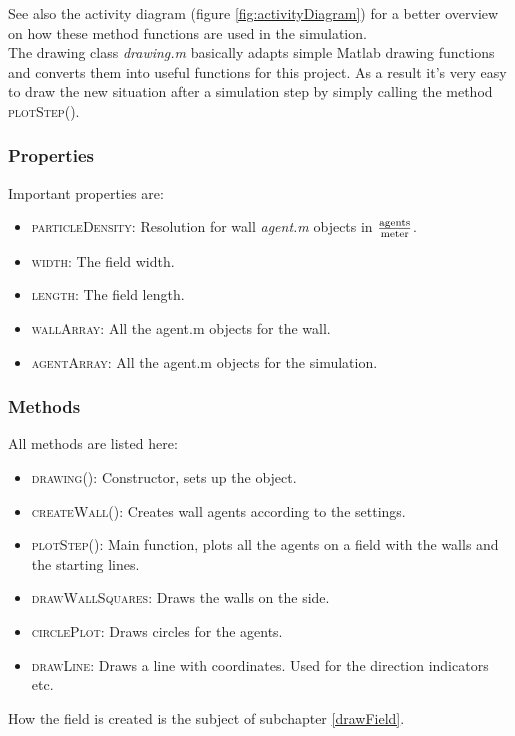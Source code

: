 \noi See also the activity diagram (figure \ref{fig:activityDiagram}) for a better overview on how these method functions are used in the simulation.\\

\noi The drawing class \textit{drawing.m} basically adapts simple Matlab drawing functions and converts them into useful functions for this project. As a result it's very easy to draw the new situation after a simulation step by simply calling the method \textsc{plotStep()}.

\subsubsection{Properties}
Important properties are:
\begin{itemize}
\item \textsc{particleDensity}: Resolution for wall \textit{agent.m} objects in $\frac{\text{agents}}{\text{meter}}$.
\item \textsc{width}: The field width.
\item \textsc{length}: The field length.
\item \textsc{wallArray}: All the agent.m objects for the wall.
\item \textsc{agentArray}: All the agent.m objects for the simulation.
\end{itemize}

\subsubsection{Methods}
All methods are listed here:
\begin{itemize}
\item \textsc{drawing()}: Constructor, sets up the object.
\item \textsc{createWall()}: Creates wall agents according to the settings.
\item \textsc{plotStep()}: Main function, plots all the agents on a field with the walls and the starting lines. 
\item \textsc{drawWallSquares}: Draws the walls on the side.
\item \textsc{circlePlot}: Draws circles for the agents.
\item \textsc{drawLine}: Draws a line with coordinates. Used for the direction indicators etc.
\end{itemize}
\noi How the field is created is the subject of subchapter \ref{drawField}.

